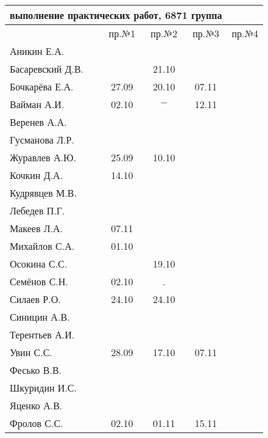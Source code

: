 \documentclass[a4paper,landscape,11pt]{article}
\begin{document}
\begin{tabular}{l|cccc}
\multicolumn{4}{c}{выполнение практических работ, 6871 группа} \\
\toprule
& пр.№1 & пр.№2  &  пр.№3 &  пр.№4\\
\midrule
Аникин Е.А.     &     &     &     &\\    
Басаревский Д.В.&     &21.10&     &\\
Бочкарёва Е.А.  &27.09&20.10&07.11&\\
Вайман А.И.     &02.10&$-$  &12.11&\\
Веренев А.А.    &     &     &     &\\
Гусманова Л.Р.  &     &     &     &\\
Журавлев А.Ю.   &25.09&10.10&     &\\
Кочкин Д.А.     &14.10&     &     &\\
Кудрявцев М.В.  &     &     &     &\\
Лебедев П.Г.    &     &     &     &\\
Макеев Л.А.     &07.11&     &     &\\
Михайлов С.А.   &01.10&     &     &\\
Осокина С.С.    &     &19.10&     &\\
Семёнов С.Н.    &02.10&  .  &     &\\
Силаев Р.О.     &24.10&24.10&     &\\
Синицин А.В.    &     &     &     &\\
Терентьев А.И.  &     &     &     &\\
Увин С.С.       &28.09&17.10&07.11&\\
Фесько В.В.     &     &     &     &\\
Шкуридин И.С.   &     &     &     &\\
Яценко А.В.     &     &     &     &\\
Фролов С.С.     &02.10&01.11&15.11&\\
\bottomrule
\end{tabular}
\end{document}
